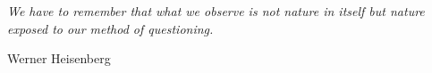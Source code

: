 
\thispagestyle{empty}

\begin{center}
\begin{minipage}{8.5cm}

\begin{large}
\emph{We have to remember that what we observe is not nature in itself but nature exposed to our method of questioning.}

\begin{flushright}
Werner Heisenberg
\end{flushright}
\end{large}

\end{minipage}
\end{center}


\newpage
\thispagestyle{empty}
